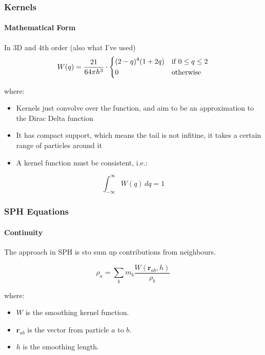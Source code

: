 \documentclass[notheorems, aspectratio=169]{beamer}
\begin{document}
  \begin{frame}
    \frametitle{Kernels}
    \framesubtitle{Mathematical Form}

    In 3D and 4th order (also what I've used)
    \begin{equation}
      W(q) = \frac{21}{64\pi h^3} \cdot
      \begin{dcases}
        (2 - q)^4 (1 + 2q) & \text{if } 0 \leq q \leq 2 \\
        0 & \text{otherwise}
      \end{dcases}
      \end{equation}
    
    where:
    \begin{itemize}
      \item Kernels just convolve over the function, and aim to be an approximation to the Dirac Delta function
      \item It has compact support, which means the tail is not infitine, it takes a certain range of particles around it
      \item A kernel function must be consistent, i.e.:
    \end{itemize}

    \begin{equation}
      \int_{-\infty}^{\infty} W(q) \, dq = 1
      \end{equation}
    
    \end{frame}
    



  \begin{frame}[fragile]
  \frametitle{SPH Equations}
  \framesubtitle{Continuity}
  
  The approach in SPH is sto sum up contributions from neighbours.
  
  \begin{equation}
  \rho_a = \sum_{b} m_b \frac{W(\mathbf{r}_{ab}, h)}{\rho_b}
  \end{equation}
  
  
  where:
  \begin{itemize}
    \item \( W \) is the smoothing kernel function.
    \item \( \mathbf{r}_{ab} \) is the vector from particle \( a \) to \( b \).
    \item \( h \) is the smoothing length.
  \end{itemize}
  
  \end{frame}
\end{document}
